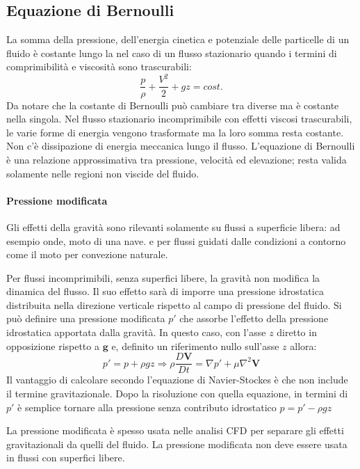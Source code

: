\subsection{Equazione di Bernoulli}
La somma della pressione, dell'energia cinetica e potenziale delle particelle di un fluido è costante lungo la  nel caso di un flusso stazionario quando i termini di comprimibilità e viscosità sono trascurabili:
\begin{equation}
\frac{p}{\rho} + \frac{V^2}{2}+gz = cost.
\label{eqn:Bernoulli}
\end{equation}
Da notare che la costante di Bernoulli può cambiare tra diverse  ma è costante nella singola.
Nel flusso stazionario incomprimibile con effetti viscosi trascurabili, le varie forme di energia vengono trasformate ma la loro somma resta costante. Non c'è dissipazione di energia meccanica lungo il flusso.
L'equazione di Bernoulli è una relazione approssimativa tra pressione, velocità ed elevazione; resta valida solamente nelle regioni non viscide del fluido.

\paragraph{Pressione modificata}
Gli effetti della gravità sono rilevanti solamente su flussi a superficie libera: ad esempio onde, moto di una nave. e per flussi guidati dalle condizioni a contorno come il moto per convezione naturale.

Per flussi incomprimibili, senza superfici libere, la gravità non modifica la dinamica del flusso. Il suo effetto sarà di imporre una pressione idrostatica distribuita nella direzione verticale rispetto al campo di pressione del fluido.
Si può definire una pressione modificata $p'$ che assorbe l'effetto della pressione idrostatica apportata dalla gravità. In questo caso, con l'asse $z$ diretto in opposizione rispetto a $\mathbf{g}$ e, definito un riferimento nullo sull'asse $z$ allora:
\begin{equation}
p' = p + \rho g z \Rightarrow \rho \frac{D\mathbf{V}}{Dt} = \nabla p' + \mu \nabla^2\mathbf{V}
\end{equation}
Il vantaggio di calcolare secondo l'equazione di Navier-Stockes è che non include il termine gravitazionale. Dopo la risoluzione con quella equazione, in termini di $p'$ è semplice tornare alla pressione senza contributo idrostatico $p = p' - \rho g z$

La pressione modificata è spesso usata nelle analisi \ac{CFD} per separare gli effetti gravitazionali da quelli del fluido.
La pressione modificata non deve essere usata in flussi con superfici libere.

